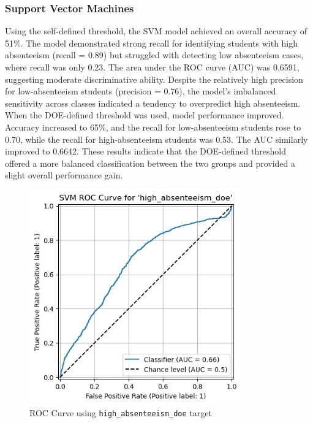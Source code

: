 \documentclass[
  11pt,
]{article}
\begin{document}
\subsubsection{Support Vector Machines}\label{support-vector-machines-1}

Using the self-defined threshold, the SVM model achieved an overall
accuracy of 51\%. The model demonstrated strong recall for identifying
students with high absenteeism (recall = 0.89) but struggled with
detecting low absenteeism cases, where recall was only 0.23. The area
under the ROC curve (AUC) was 0.6591, suggesting moderate discriminative
ability. Despite the relatively high precision for low-absenteeism
students (precision = 0.76), the model's imbalanced sensitivity across
classes indicated a tendency to overpredict high absenteeism. When the
DOE-defined threshold was used, model performance improved. Accuracy
increased to 65\%, and the recall for low-absenteeism students rose to
0.70, while the recall for high-absenteeism students was 0.53. The AUC
similarly improved to 0.6642. These results indicate that the
DOE-defined threshold offered a more balanced classification between the
two groups and provided a slight overall performance gain.

\begin{figure}[H]

{\centering \includegraphics[width=3.6in,height=\textheight]{../images/svm-roc.png}

}

\caption{ROC Curve using \texttt{high\_absenteeism\_doe} target}

\end{figure}%
\end{document}
